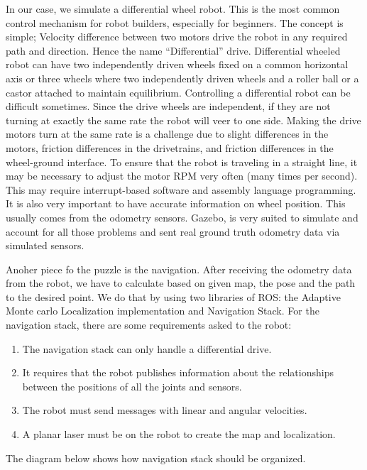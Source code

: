 \documentclass[10pt,journal,compsoc]{IEEEtran}
\begin{document}
    In our case, we simulate a differential wheel robot. This is the most common control mechanism for robot builders, especially for beginners. The concept is simple; Velocity difference between two motors drive the robot in any required path and direction. Hence the name “Differential” drive. Differential wheeled robot can have two independently driven wheels fixed on a common horizontal axis or three wheels where two independently driven wheels and a roller ball or a castor attached to maintain equilibrium. Controlling a differential robot can be difficult sometimes. Since the drive wheels are independent, if they are not turning at exactly the same rate the robot will veer to one side. Making the drive motors turn at the same rate is a challenge due to slight differences in the motors, friction differences in the drivetrains, and friction differences in the wheel-ground interface. To ensure that the robot is traveling in a straight line, it may be necessary to adjust the motor RPM very often (many times per second). This may require interrupt-based software and assembly language programming. It is also very important to have accurate information on wheel position. This usually comes from the odometry sensors. Gazebo, is very suited to simulate and account for all those problems and sent real ground truth odometry data via simulated sensors.

    Anoher piece fo the puzzle is the navigation. After receiving the odometry data from the robot, we have to calculate based on given map, the pose and the path to the desired point. We do that by using two libraries of ROS: the Adaptive Monte carlo Localization implementation and Navigation Stack. For the navigation stack, there are some requirements asked to the robot:
    \begin{enumerate}
        \item The navigation stack can only handle a differential drive.
        \item It requires that the robot publishes information about the relationships between the positions of all the	joints and sensors.
        \item The robot must send messages with linear and angular velocities.
        \item A	planar laser must be on	the	robot to create	the	map	and	localization.
    \end {enumerate}
    The diagram below shows how navigation stack should be organized.
\end{document}
